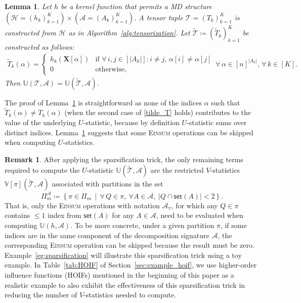 \documentclass[sn-mathphys, natbib=false]{sn-jnl}
\theoremstyle{plain}
\newtheorem{lemma}{Lemma}
\theoremstyle{definition}
\newtheorem{remark}{Remark}
\def\tilde{\widetilde}
\def\Einsum{\textsc{Einsum}}
\newcommand{\ustat}{\mathbb{U}}
\newcommand{\vstat}{\mathbb{V}}
\newcommand{\takesetp}[1]{\mathsf{set}(#1)}
\newcommand{\partition}{\Pi}
\newcommand{\partitionp}[1]{\partition_{#1}}
\def\calA{\mathcal{A}}
\def\calT{\mathcal{T}}
\def\calH{\mathcal{H}}
\begin{document}
\begin{bibunit}[agsm]
\begin{lemma}\label{lem:sparsification_trick}
Let $h$ be a kernel function that permits a MD structure $(\calH = (h_k)_{k=1}^K) \times (\calA = (A_k)_{k=1}^K)$. A tensor tuple $\calT = (T_k)_{k = 1}^{K}$ is constructed from $\calH$ as in Algorithm~\ref{alg:tensorization}. Let $\tilde{\calT} \coloneqq (\tilde{T}_k)_{k=1}^K$ be constructed as follows:
\begin{equation}
\label{tilde_T}
\begin{split}
\tilde{T}_k (\alpha) = 
\begin{cases}
h_k (\bm{X}[\alpha]) & \text{if } \forall \, i,j \in [|A_k|]: i \neq j, \, \alpha [i] \neq \alpha [j] \\
0 & \text{otherwise}, 
\end{cases}
\, \forall \, \alpha \in [n]^{|A_k|}, \, \forall \, k \in [K]. 
\end{split}
\end{equation}
Then $\ustat(\calT, \calA) = \ustat(\tilde{\calT}, \calA)$.
\end{lemma}

The proof of Lemma~\ref{lem:sparsification_trick} is straightforward as none of the indices $\alpha$ such that $\tilde{T}_{k} (\alpha) \neq T_{k} (\alpha)$ (when the second case of \eqref{tilde_T} holds) contributes to the value of the underlying $U$-statistic, because by definition $U$-statistic sums over distinct indices. Lemma~\ref{lem:sparsification_trick} suggests that some \Einsum{} operations can be skipped when computing $U$-statistics.

\begin{remark}\label{rem:sparsification_terms_revised}
After applying the sparsification trick, the only remaining terms required to compute the $U$-statistic $\ustat(\widetilde{\calT}, \calA)$ are the restricted $V$-statistics $\vstat[\pi](\widetilde{\calT}, \calA)$ associated with partitions in the set
\begin{equation}
\label{eq:quotient_set}
\partition_m^\calA \coloneqq \left\{ \pi \in \partitionp{m} \,\middle|\, \forall \, Q \in \pi,\ \forall A \in \calA,\ |Q \cap \takesetp{A}| < 2 \right\}.
\end{equation}
That is, only the \Einsum{} operations with notation $\calA_\pi$, for which any $Q \in \pi$ contains $\leq 1$ index from $\takesetp{A}$ for any $A \in \calA$, need to be evaluated when computing $\ustat(h, \calA)$.  To be more concrete, under a given partition $\pi$, if some indices are in the same component of the decomposition signature $\calA$, the corresponding \Einsum{} operation can be skipped because the result must be zero. Example~\ref{eg:sparsification} will illustrate this sparsification trick using a toy example. In Table~\ref{tab:HOIF} of Section~\ref{sec:example_hoif}, we use higher-order influence functions (HOIFs) mentioned in the beginning of this paper as a realistic example to also exhibit the effectiveness of this sparsification trick in reducing the number of $V$-statistics needed to compute.
\end{remark}


\end{bibunit}
\end{document}
